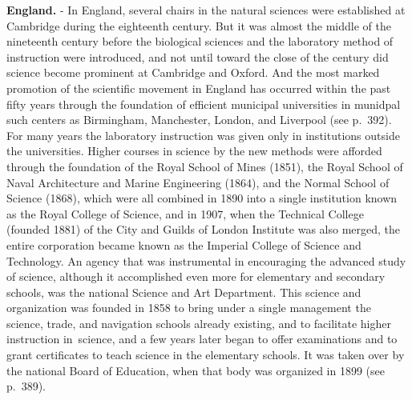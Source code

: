 \documentclass[
]{book}
\begin{document}
\textbf{England.} - In England, several chairs in the natural sciences were established at Cambridge during the eighteenth century. But it was almost the middle of the nineteenth century before the biological sciences and the laboratory method of instruction were introduced, and not until toward the close of the century did science become prominent at Cambridge and Oxford. And the most marked promotion of the scientific movement in England has occurred within the past fifty years through the foundation of efficient municipal universities in munidpal such centers as Birmingham, Manchester, London, and Liverpool (see p.~392). For many years the laboratory instruction was given only in institutions outside the universities. Higher courses in science by the new methods were afforded through the foundation of the Royal School of Mines (1851), the Royal School of Naval Architecture and Marine Engineering (1864), and the Normal School of Science (1868), which were all combined in 1890 into a single institution known as the Royal College of Science, and in 1907, when the Technical College (founded 1881) of the City and Guilds of London Institute was also merged, the entire corporation became known as the Imperial College of Science and Technology. An agency that was instrumental in encouraging the advanced study of science, although it accomplished even more for elementary and secondary schools, was the national Science and Art Department. This science and organization was founded in 1858 to bring under a single management the science, trade, and navigation schools already existing, and to facilitate higher instruction in~science, and a few years later began to offer examinations and to grant certificates to teach science in the elementary schools. It was taken over by the national Board of Education, when that body was organized in 1899 (see p.~389).
\end{document}
